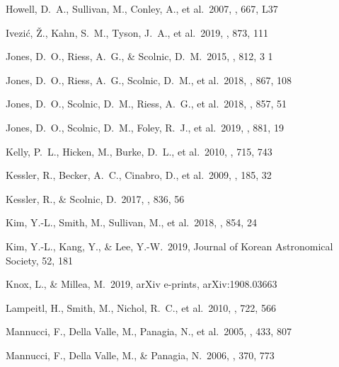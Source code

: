 \documentclass[]{aa} %
\begin{document}
\begin{thebibliography}{}
 Howell, D.~A., Sullivan, M., Conley,
A., et al.\ 2007, \apjl, 667, L37



 Ivezi{\'c}, {\v{Z}}., Kahn, S.~M.,
Tyson, J.~A., et al.\ 2019, \apj, 873, 111


 Jones, D.~O., Riess, A.~G., \& Scolnic,
D.~M.\ 2015, \apj, 812, 3 1

 Jones, D.~O., Riess, A.~G., Scolnic,
D.~M., et al.\ 2018, \apj, 867, 108

 Jones, D.~O., Scolnic, D.~M., Riess,
A.~G., et al.\ 2018, \apj, 857, 51

 Jones, D.~O., Scolnic, D.~M., Foley,
R.~J., et al.\ 2019, \apj, 881, 19


 Kelly, P.~L., Hicken, M., Burke, D.~L.,
et al.\ 2010, \apj, 715, 743

 Kessler, R., Becker, A.~C., Cinabro,
D., et al.\ 2009, \apjs, 185, 32

 Kessler, R., \& Scolnic, D.\
2017, \apj, 836, 56

 Kim, Y.-L., Smith, M., Sullivan, M., et al.\
2018, \apj, 854, 24

 Kim, Y.-L., Kang, Y., \& Lee, Y.-W.\ 2019,
Journal of Korean Astronomical Society, 52, 181

 Knox, L., \& Millea, M.\ 2019, arXiv
e-prints, arXiv:1908.03663


 Lampeitl, H., Smith, M., Nichol,
R.~C., et al.\ 2010, \apj, 722, 566


 Mannucci, F., Della Valle, M.,
Panagia, N., et al.\ 2005, \aap, 433, 807 

 Mannucci, F., Della Valle, M., \&
Panagia, N.\ 2006, \mnras, 370, 773 


\end{thebibliography}
\end{document}
